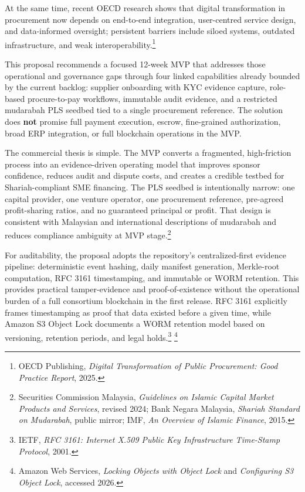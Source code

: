 \documentclass[11pt,a4paper]{article}
\begin{document}
At the same time, recent OECD research shows that digital transformation in procurement now depends on end-to-end integration, user-centred service design, and data-informed oversight; persistent barriers include siloed systems, outdated infrastructure, and weak interoperability.\footnote{OECD Publishing, \emph{Digital Transformation of Public Procurement: Good Practice Report}, 2025.}

This proposal recommends a focused 12-week MVP that addresses those operational and governance gaps through four linked capabilities already bounded by the current backlog: supplier onboarding with KYC evidence capture, role-based procure-to-pay workflows, immutable audit evidence, and a restricted mudarabah PLS seedbed tied to a single procurement reference. The solution does \textbf{not} promise full payment execution, escrow, fine-grained authorization, broad ERP integration, or full blockchain operations in the MVP.

The commercial thesis is simple. The MVP converts a fragmented, high-friction process into an evidence-driven operating model that improves sponsor confidence, reduces audit and dispute costs, and creates a credible testbed for Shariah-compliant SME financing. The PLS seedbed is intentionally narrow: one capital provider, one venture operator, one procurement reference, pre-agreed profit-sharing ratios, and no guaranteed principal or profit. That design is consistent with Malaysian and international descriptions of mudarabah and reduces compliance ambiguity at MVP stage.\footnote{Securities Commission Malaysia, \emph{Guidelines on Islamic Capital Market Products and Services}, revised 2024; Bank Negara Malaysia, \emph{Shariah Standard on Mudarabah}, public mirror; IMF, \emph{An Overview of Islamic Finance}, 2015.}

For auditability, the proposal adopts the repository's centralized-first evidence pipeline: deterministic event hashing, daily manifest generation, Merkle-root computation, RFC 3161 timestamping, and immutable or WORM retention. This provides practical tamper-evidence and proof-of-existence without the operational burden of a full consortium blockchain in the first release. RFC 3161 explicitly frames timestamping as proof that data existed before a given time, while Amazon S3 Object Lock documents a WORM retention model based on versioning, retention periods, and legal holds.\footnote{IETF, \emph{RFC 3161: Internet X.509 Public Key Infrastructure Time-Stamp Protocol}, 2001.} \footnote{Amazon Web Services, \emph{Locking Objects with Object Lock} and \emph{Configuring S3 Object Lock}, accessed 2026.}
\end{document}
